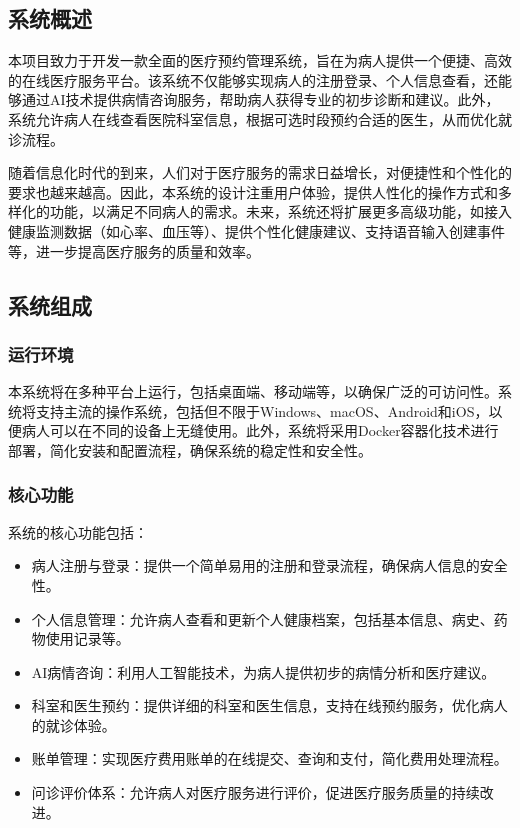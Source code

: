 \subsection{系统概述}
本项目致力于开发一款全面的医疗预约管理系统，旨在为病人提供一个便捷、高效的在线医疗服务平台。该系统不仅能够实现病人的注册登录、个人信息查看，还能够通过AI技术提供病情咨询服务，帮助病人获得专业的初步诊断和建议。此外，系统允许病人在线查看医院科室信息，根据可选时段预约合适的医生，从而优化就诊流程。

随着信息化时代的到来，人们对于医疗服务的需求日益增长，对便捷性和个性化的要求也越来越高。因此，本系统的设计注重用户体验，提供人性化的操作方式和多样化的功能，以满足不同病人的需求。未来，系统还将扩展更多高级功能，如接入健康监测数据（如心率、血压等）、提供个性化健康建议、支持语音输入创建事件等，进一步提高医疗服务的质量和效率。

\subsection{系统组成}
\subsubsection{运行环境}
本系统将在多种平台上运行，包括桌面端、移动端等，以确保广泛的可访问性。系统将支持主流的操作系统，包括但不限于Windows、macOS、Android和iOS，以便病人可以在不同的设备上无缝使用。此外，系统将采用Docker容器化技术进行部署，简化安装和配置流程，确保系统的稳定性和安全性。

\subsubsection{核心功能}

系统的核心功能包括：
\begin{itemize}
	\item 病人注册与登录：提供一个简单易用的注册和登录流程，确保病人信息的安全性。
	\item 个人信息管理：允许病人查看和更新个人健康档案，包括基本信息、病史、药物使用记录等。
	\item AI病情咨询：利用人工智能技术，为病人提供初步的病情分析和医疗建议。
	\item 科室和医生预约：提供详细的科室和医生信息，支持在线预约服务，优化病人的就诊体验。
	\item 账单管理：实现医疗费用账单的在线提交、查询和支付，简化费用处理流程。
	\item 问诊评价体系：允许病人对医疗服务进行评价，促进医疗服务质量的持续改进。
\end{itemize}

